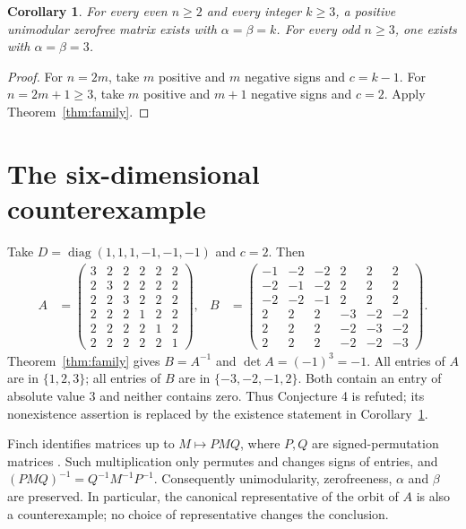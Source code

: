 \documentclass[11pt,a4paper]{article}
\newtheorem{corollary}[theorem]{Corollary}
\DeclareMathOperator{\diag}{diag}
\begin{document}
\begin{corollary}\label{cor:orders}
For every even $n\geq2$ and every integer $k\geq3$, a positive
unimodular zerofree matrix exists with $\alpha=\beta=k$.
For every odd $n\geq3$, one exists with $\alpha=\beta=3$.
\end{corollary}
\begin{proof}
For $n=2m$, take $m$ positive and $m$ negative signs and $c=k-1$.
For $n=2m+1\geq3$, take $m$ positive and $m+1$ negative signs
and $c=2$. Apply Theorem~\ref{thm:family}.
\end{proof}

\section{The six-dimensional counterexample}
Take $D=\diag(1,1,1,-1,-1,-1)$ and $c=2$. Then
\begin{align*}
 A&=\begin{pmatrix}
 3&2&2&2&2&2\\
 2&3&2&2&2&2\\
 2&2&3&2&2&2\\
 2&2&2&1&2&2\\
 2&2&2&2&1&2\\
 2&2&2&2&2&1
 \end{pmatrix},&
 B&=\begin{pmatrix}
 -1&-2&-2&2&2&2\\
 -2&-1&-2&2&2&2\\
 -2&-2&-1&2&2&2\\
 2&2&2&-3&-2&-2\\
 2&2&2&-2&-3&-2\\
 2&2&2&-2&-2&-3
 \end{pmatrix}.
\end{align*}
Theorem~\ref{thm:family} gives $B=A^{-1}$ and
$\det A=(-1)^3=-1$. All entries of $A$ are in $\{1,2,3\}$;
all entries of $B$ are in $\{-3,-2,-1,2\}$. Both contain an
entry of absolute value $3$ and neither contains zero. Thus
Conjecture 4 is refuted; its nonexistence assertion is replaced by
the existence statement in Corollary~\ref{cor:orders}.

Finch identifies matrices up to $M\mapsto PMQ$, where $P,Q$ are
signed-permutation matrices \cite[p.~2]{finch}. Such multiplication
only permutes and changes signs of entries, and
$(PMQ)^{-1}=Q^{-1}M^{-1}P^{-1}$. Consequently unimodularity,
zerofreeness, $\alpha$ and $\beta$ are preserved. In particular,
the canonical representative of the orbit of $A$ is also a
counterexample; no choice of representative changes the conclusion.
\end{document}
